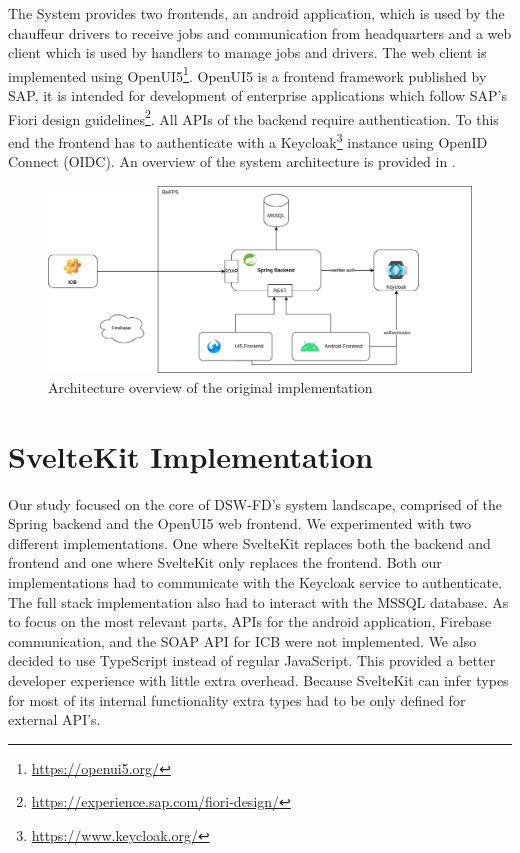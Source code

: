 The System provides two frontends, an android application, which is used by the chauffeur drivers to receive jobs and communication from headquarters and a web client which is used by handlers to manage jobs and drivers. The web client is implemented using OpenUI5\footnote{\url{https://openui5.org/}}. OpenUI5 is a frontend framework published by SAP, it is intended for development of enterprise applications which follow SAP's Fiori design guidelines\footnote{\url{https://experience.sap.com/fiori-design/}}. All APIs of the backend require authentication. To this end the frontend has to authenticate with a Keycloak\footnote{\url{https://www.keycloak.org/}} instance using OpenID Connect (OIDC). An overview of the system architecture is provided in .

\begin{figure}[ht]
    \centering
    \includegraphics[width=.8\linewidth]{assets/dswfd-architecture}
    \caption{Architecture overview of the original implementation}
    \label{fig:dswfd-architecture}
\end{figure}

\section{SvelteKit Implementation}
Our study focused on the core of DSW-FD's system landscape, comprised of the Spring backend and the OpenUI5 web frontend. We experimented with two different implementations. One where SvelteKit replaces both the backend and frontend and one where SvelteKit only replaces the frontend. Both our implementations had to communicate with the Keycloak service to authenticate. The full stack implementation also had to interact with the MSSQL database. As to focus on the most relevant parts, APIs for the android application, Firebase communication, and the SOAP API for ICB were not implemented. We also decided to use TypeScript instead of regular JavaScript. This provided a better developer experience with little extra overhead. Because SvelteKit can infer types for most of its internal functionality extra types had to be only defined for external API's.


